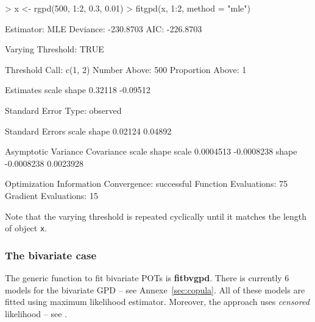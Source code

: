 \documentclass[a4paper]{article}
\numberwithin{equation}{section}
\theoremstyle{definition}
\begin{document}
\begin{Schunk}
\begin{Sinput}
> x <- rgpd(500, 1:2, 0.3, 0.01)
> fitgpd(x, 1:2, method = "mle")
\end{Sinput}
\begin{Soutput}
Estimator: MLE 
Deviance: -230.8703 
     AIC: -226.8703 

Varying Threshold: TRUE 

Threshold Call: c(1, 2) 
Number Above: 500 
Proportion Above: 1 

Estimates
   scale     shape  
 0.32118  -0.09512  

Standard Error Type: observed 

Standard Errors
  scale    shape  
0.02124  0.04892  

Asymptotic Variance Covariance
       scale       shape     
scale   0.0004513  -0.0008238
shape  -0.0008238   0.0023928

Optimization Information
  Convergence: successful 
  Function Evaluations: 75 
  Gradient Evaluations: 15 
\end{Soutput}
\end{Schunk}

Note that the varying threshold is repeated cyclically until it
matches the length of object \verb|x|.

\subsubsection{The bivariate case}

The generic function to fit bivariate POTs is \textbf{fitbvgpd}. There
is currently 6 models for the bivariate GPD -- see
Annexe~\ref{sec:copula}. All of these models are fitted using maximum
likelihood estimator. Moreover, the approach uses \emph{censored}
likelihood -- see \citep{Smith1997}.
\end{document}
